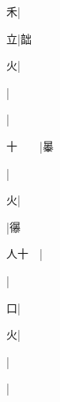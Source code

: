 \begin{multicols}{2}
{{\cjk{}{\cnsym{}　}{\cnsym{}　}禾}|{}\par
{\cjk{}{\cnsym{}　}{\cnsym{}　}立}|{\cjk{}韷}\par
{\cjk{}{\cnsym{}　}{\cnsym{}　}火}|{}\par
{\cjk{}{\cnsym{}　}{\cnsym{}　}{\cnsym{}　}}|{}\par
{\cjk{}{\cnsym{}　}{\cnsym{}　}{\cnsym{}　}}|{}\par
{\cjk{}十{\cnsym{}　}{\cnsym{}　}}|{\cjk{}曓}\par
{}|{}\par
{\cjk{}{\cnsym{}　}{\cnsym{}　}火}|{}\par
{}|{\cjk{}忁}\par
{\cjk{}人十{\cnsym{}　}}|{}\par
{\cjk{}{\cnsym{}　}{\cnsym{}　}{\cnsym{}　}}|{}\par
{\cjk{}{\cnsym{}　}{\cnsym{}　}口}|{}\par
{\cjk{}{\cnsym{}　}{\cnsym{}　}火}|{}\par
{\cjk{}{\cnsym{}　}{\cnsym{}　}{\cnsym{}　}}|{}\par
{}|{}\par
}
\end{multicols}
